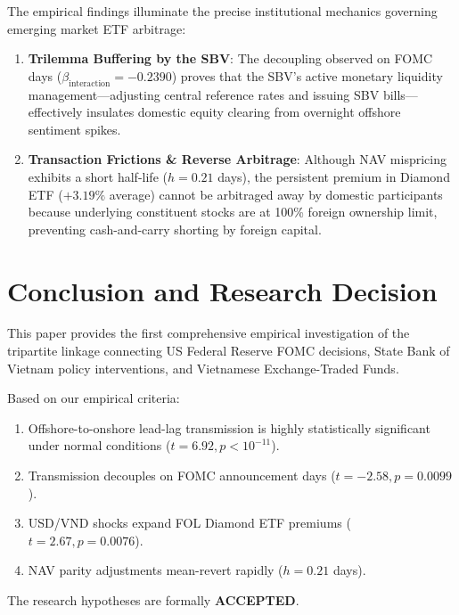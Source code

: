 \documentclass{article}
\begin{document}
The empirical findings illuminate the precise institutional mechanics governing emerging market ETF arbitrage:
\begin{enumerate}
    \item \textbf{Trilemma Buffering by the SBV}: The decoupling observed on FOMC days ($\beta_{\text{interaction}} = -0.2390$) proves that the SBV's active monetary liquidity management—adjusting central reference rates and issuing SBV bills—effectively insulates domestic equity clearing from overnight offshore sentiment spikes.
    \item \textbf{Transaction Frictions \& Reverse Arbitrage}: Although NAV mispricing exhibits a short half-life ($h = 0.21$ days), the persistent premium in Diamond ETF ($+3.19\%$ average) cannot be arbitraged away by domestic participants because underlying constituent stocks are at 100\% foreign ownership limit, preventing cash-and-carry shorting by foreign capital.
\end{enumerate}

\section{Conclusion and Research Decision}
\label{sec:conclusion}

This paper provides the first comprehensive empirical investigation of the tripartite linkage connecting US Federal Reserve FOMC decisions, State Bank of Vietnam policy interventions, and Vietnamese Exchange-Traded Funds. 

Based on our empirical criteria:
\begin{enumerate}
    \item Offshore-to-onshore lead-lag transmission is highly statistically significant under normal conditions ($t = 6.92, p < 10^{-11}$).
    \item Transmission decouples on FOMC announcement days ($t = -2.58, p = 0.0099$).
    \item USD/VND shocks expand FOL Diamond ETF premiums ($t = 2.67, p = 0.0076$).
    \item NAV parity adjustments mean-revert rapidly ($h = 0.21$ days).
\end{enumerate}
The research hypotheses are formally \textbf{ACCEPTED}.



\end{document}
